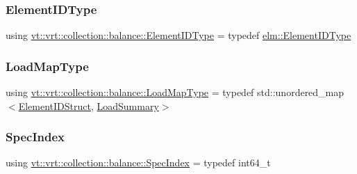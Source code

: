\mbox{\label{namespacevt_1_1vrt_1_1collection_1_1balance_a592736f733df4f90856df90a1fd08905}} 
\subsubsection{\texorpdfstring{Element\+I\+D\+Type}{ElementIDType}}
{\footnotesize\ttfamily using \hyperlink{namespacevt_1_1vrt_1_1collection_1_1balance_a592736f733df4f90856df90a1fd08905}{vt\+::vrt\+::collection\+::balance\+::\+Element\+I\+D\+Type} = typedef \hyperlink{namespacevt_1_1elm_a63afb64985b41b7b6dcf2f01336391f8}{elm\+::\+Element\+I\+D\+Type}}

\mbox{\label{namespacevt_1_1vrt_1_1collection_1_1balance_a5339303db2e1ce964d783a53fd74e6b1}} 
\subsubsection{\texorpdfstring{Load\+Map\+Type}{LoadMapType}}
{\footnotesize\ttfamily using \hyperlink{namespacevt_1_1vrt_1_1collection_1_1balance_a5339303db2e1ce964d783a53fd74e6b1}{vt\+::vrt\+::collection\+::balance\+::\+Load\+Map\+Type} = typedef std\+::unordered\+\_\+map$<$\hyperlink{namespacevt_1_1vrt_1_1collection_1_1balance_a9f5b53fafb270212279a4757d2c4cd28}{Element\+I\+D\+Struct}, \hyperlink{structvt_1_1vrt_1_1collection_1_1balance_1_1_load_summary}{Load\+Summary}$>$}

\mbox{\label{namespacevt_1_1vrt_1_1collection_1_1balance_a72a5e0d9936ddf57f8e6c64e0e9fd123}} 
\subsubsection{\texorpdfstring{Spec\+Index}{SpecIndex}}
{\footnotesize\ttfamily using \hyperlink{namespacevt_1_1vrt_1_1collection_1_1balance_a72a5e0d9936ddf57f8e6c64e0e9fd123}{vt\+::vrt\+::collection\+::balance\+::\+Spec\+Index} = typedef int64\+\_\+t}

